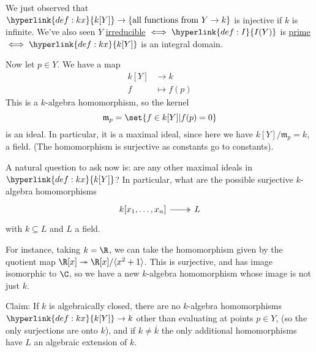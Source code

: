 \documentclass{article}
\begin{document}
We just observed that $\hyperlink{def:kx}{k[Y]} \to \{\text{all functions from } Y \to k\}$ is injective if $k$ is infinite.
We've also seen $Y$ \hyperlink{def:reducible}{irreducible} $\iff \hyperlink{def:I}{I(Y)}$ is \hyperlink{def:prime}{prime} $\iff \hyperlink{def:kx}{k[Y]}$ is an integral domain.

Now let $p \in Y$. We have a map
\begin{align*}
    k[Y] &\longrightarrow k \\
    f &\longmapsto f(p)
\end{align*}
This is a $k$-algebra homomorphism, so the kernel
\begin{equation*}
    \mathfrak{m}_p = \set{f \in k[Y] | f(p) = 0}
\end{equation*}
is an ideal.
In particular, it is a maximal ideal, since here we have $k[Y]/\mathfrak{m}_p = k$, a field.
(The homomorphism is surjective as constants go to constants).

A natural question to ask now is: are any other maximal ideals in $\hyperlink{def:kx}{k[Y]}$?
In particular, what are the possible surjective $k$-algebra homomorphisms
\begin{equation*}
    \begin{tikzcd}
        k[x_1, \dotsc, x_n] \ar[r, two heads] & L
    \end{tikzcd}
\end{equation*}
with $k \subseteq L$ and $L$ a field.

For instance, taking $k=\R$, we can take the homomorphism given by the quotient map $\R[x] \twoheadrightarrow \R[x]/\langle x^2 + 1 \rangle$.
This is surjective, and has image isomorphic to $\C$, so we have a new $k$-algebra homomorphism whose image is not just $k$.

Claim:
If $k$ is algebraically closed, there are no $k$-algebra homomorphisms $\hyperlink{def:kx}{k[Y]} \to k$ other than evaluating at points $p \in Y$, (so the only surjections are onto $k$), and if $k \neq \overline{k}$ the only additional homomorphisms have $L$ an algebraic extension of $k$.
\end{document}
